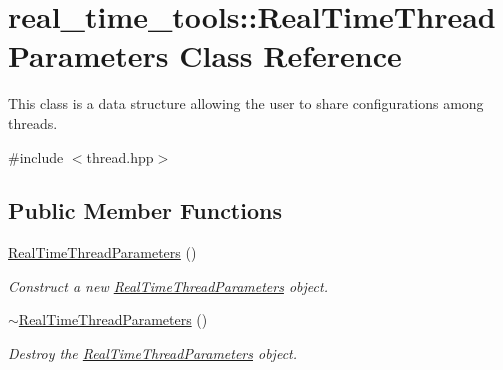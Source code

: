 \hypertarget{classreal__time__tools_1_1RealTimeThreadParameters}{}\section{real\+\_\+time\+\_\+tools\+:\+:Real\+Time\+Thread\+Parameters Class Reference}
\label{classreal__time__tools_1_1RealTimeThreadParameters}


This class is a data structure allowing the user to share configurations among threads.  




{\ttfamily \#include $<$thread.\+hpp$>$}

\subsection*{Public Member Functions}
\begin{DoxyCompactItemize}
\item 
\hyperlink{classreal__time__tools_1_1RealTimeThreadParameters_a3c23c4f6a5b8ac991072e247f536fcd8}{Real\+Time\+Thread\+Parameters} ()\hypertarget{classreal__time__tools_1_1RealTimeThreadParameters_a3c23c4f6a5b8ac991072e247f536fcd8}{}\label{classreal__time__tools_1_1RealTimeThreadParameters_a3c23c4f6a5b8ac991072e247f536fcd8}

\begin{DoxyCompactList}\small\item\em Construct a new \hyperlink{classreal__time__tools_1_1RealTimeThreadParameters}{Real\+Time\+Thread\+Parameters} object. \end{DoxyCompactList}\item 
\hyperlink{classreal__time__tools_1_1RealTimeThreadParameters_a9b6720cd9e0da2ad81e22e337a76d7ea}{$\sim$\+Real\+Time\+Thread\+Parameters} ()\hypertarget{classreal__time__tools_1_1RealTimeThreadParameters_a9b6720cd9e0da2ad81e22e337a76d7ea}{}\label{classreal__time__tools_1_1RealTimeThreadParameters_a9b6720cd9e0da2ad81e22e337a76d7ea}

\begin{DoxyCompactList}\small\item\em Destroy the \hyperlink{classreal__time__tools_1_1RealTimeThreadParameters}{Real\+Time\+Thread\+Parameters} object. \end{DoxyCompactList}\end{DoxyCompactItemize}
